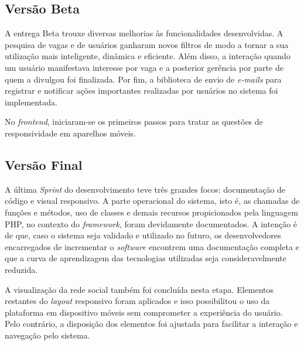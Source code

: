 \subsection{Versão Beta}
\label{implementacaoBR}

A entrega Beta trouxe diversas melhorias às funcionalidades desenvolvidas. A pesquisa de vagas e de usuários ganharam novos filtros de modo a tornar a sua utilização mais inteligente, dinâmica e eficiente. Além disso, a interação quando um usuário manifestava interesse por vaga e a posterior gerência por parte de quem a divulgou foi finalizada. Por fim, a biblioteca de envio de \textit{e-mails} para registrar e notificar ações importantes realizadas por usuários no sistema foi implementada.

No \textit{frontend}, iniciaram-se os primeiros passos para tratar as questões de responsividade em aparelhos móveis.

\subsection{Versão Final}
\label{implementacaoFR}

A última \textit{Sprint} do desenvolvimento teve três grandes focos: documentação de código e visual responsivo.  A parte operacional do sistema, isto é, as chamadas de funções e métodos, uso de classes e demais recursos propicionados pela linguagem PHP, no contexto do \textit{framework}, foram devidamente documentados. A intenção é de que, caso o sistema seja validado e utilizado no futuro, os desenvolvedores encarregados de incrementar o \textit{software} encontrem uma documentação completa e que a curva de aprendizagem das tecnologias utilizadas seja consideravelmente reduzida.

A visualização da rede social também foi concluída nesta etapa. Elementos restantes do \textit{layout} responsivo foram aplicados e isso possibilitou o uso da plataforma em dispositivo móveis sem comprometer a experiência do usuário. Pelo contrário, a disposição dos elementos foi ajustada para facilitar a interação e navegação pelo sistema.